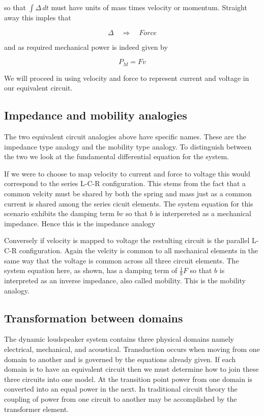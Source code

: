 \documentclass[11pt]{book}
\begin{document}
so that $\int \Delta \,dt$ must have units of mass times velocity or
momentum.  Straight away this imples that

\begin{equation*}
  \Delta \quad \Rightarrow \quad Force
\end{equation*}

and as required mechanical power is indeed given by

\begin{equation*}
  P_M = Fv
\end{equation*}

We will proceed in using velocity and force to represent current and
voltage in our equivalent circuit.

\subsection*{Impedance and mobility analogies}


The two equivalent circuit analogies above have specific names.  These
are the impedance type analogy and the mobility type analogy.  To
distinguish between the two we look at the fundamental differential
equation for the system.

If we were to choose to map velocity to current and force to voltage
this would correspond to the series L-C-R configuration.  This stems
from the fact that a common velcity must be shared by both the spring
and mass just as a common current is shared among the series cicuit
elements.  The system equation for this scenario exhibits the damping
term $bv$ so that $b$ is interpereted as a mechanical impedance.
Hence this is the impedance analogy

Conversely if velocity is mapped to voltage the restulting circuit is
the parallel L-C-R configuration.  Again the velcity is common to all
mechanical elements in the same way that the voltage is common across
all three circuit elements.  The system equation here, as shown, has a
damping term of $\frac{1}{b}F$ so that $b$ is interpreted as an
inverse impedance, also called mobility.  This is the mobility analogy.




\subsection*{Transformation between domains}

The dynamic loudspeaker system contains three physical domains namely
electrical, mechanical, and acoustical.  Transduction occurs when
moving from one domain to another and is governed by the equations
already given.  If each domain is to have an equivalent circuit then
we must determine how to join these three circuits into one model.  At
the transition point power from one domain is converted
into an equal power in the next.  In traditional circuit theory the
coupling of power from one circuit to another may be accomplished by
the transformer element.
\end{document}
